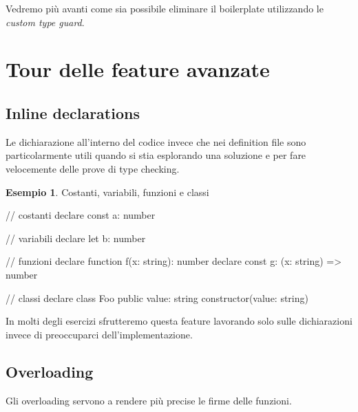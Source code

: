 \documentclass[12pt]{article}
\theoremstyle{definition}
\newtheorem{example}{Esempio}[subsection]
\newenvironment{code}
  {\vspace{0.5cm} \VerbatimEnvironment\begin{typescriptcode}}
  {\end{typescriptcode} \vspace{0.2cm}}
\begin{document}
Vedremo più avanti come sia possibile eliminare il boilerplate utilizzando le \emph{custom type guard}.

\newpage

\section{Tour delle feature avanzate}

\subsection{Inline declarations}

Le dichiarazione all'interno del codice invece che nei definition file sono particolarmente utili quando si stia esplorando
una soluzione e per fare velocemente delle prove di type checking.

\begin{example}
Costanti, variabili, funzioni e classi

\begin{code}
// costanti
declare const a: number

// variabili
declare let b: number

// funzioni
declare function f(x: string): number
declare const g: (x: string) => number

// classi
declare class Foo {
  public value: string
  constructor(value: string)
}
\end{code}
\end{example}

In molti degli esercizi sfrutteremo questa feature lavorando solo sulle dichiarazioni invece di preoccuparci dell'implementazione.

\subsection{Overloading}

Gli overloading servono a rendere più precise le firme delle funzioni.
\end{document}

